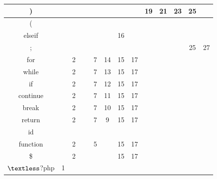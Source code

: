 \documentclass[12pt,a4paper,titlepage,final]{article}
\begin{document}
\begin{landscape}
\begin{table}
\begin{small}
\begin{tabular}{|c|c|c|c|c|c|c|c|c|c|c|c|c|}
    )        & ~    & ~    & ~    & ~         & ~    & ~           & ~         & 19         & 21          & 23      & 25        & ~         \\ \hline
    (        & ~    & ~    & ~    & ~         & ~    & ~           & ~         & ~          & ~           & ~       & ~         & ~         \\ \hline
    elseif   & ~    & ~    & ~    & ~         & ~    & 16          & ~         & ~          & ~           & ~       & ~         & ~         \\ \hline
    ;        & ~    & ~    & ~    & ~         & ~    & ~           & ~         & ~          & ~           & ~       & 25        & 27        \\ \hline
    for      & ~    & 2    & ~    & 7         & 14   & 15          & 17        & ~          & ~           & ~       & ~         & ~         \\ \hline
    while    & ~    & 2    & ~    & 7         & 13   & 15          & 17        & ~          & ~           & ~       & ~         & ~         \\ \hline
    if       & ~    & 2    & ~    & 7         & 12   & 15          & 17        & ~          & ~           & ~       & ~         & ~         \\ \hline
    continue & ~    & 2    & ~    & 7         & 11   & 15          & 17        & ~          & ~           & ~       & ~         & ~         \\ \hline
    break    & ~    & 2    & ~    & 7         & 10   & 15          & 17        & ~          & ~           & ~       & ~         & ~         \\ \hline
    return   & ~    & 2    & ~    & 7         & 9    & 15          & 17        & ~          & ~           & ~       & ~         & ~         \\ \hline
    id       & ~    & ~    & ~    & ~         & ~    & ~           & ~         & ~          & ~           & ~       & ~         & ~         \\ \hline
    function & ~    & 2    & ~    & 5         & ~    & 15          & 17        & ~          & ~           & ~       & ~         & ~         \\ \hline
    \$       & ~    & 2    & ~    & ~         & ~    & 15          & 17        & ~          & ~           & ~       & ~         & ~         \\ \hline
    $\textless$?php      & 1    & ~    & ~    & ~         & ~    & ~           & ~         & ~          & ~           & ~       & ~         & ~         \\ \hline
    \end{tabular}
    \end{small}
\end{table}
    \end{landscape}
    \clearpage%
\newpage
\end{document}
